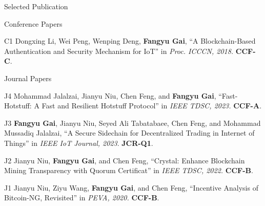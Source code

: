 \documentclass{resume} %
\begin{document}
\begin{rSection}{Selected Publication}
\begin{rSubsection}{Conference Papers}{}{}{}
\item [C1] Dongxing Li, Wei Peng, Wenping Deng, \textbf{Fangyu Gai}, ``A Blockchain-Based Authentication and Security Mechanism for IoT'' in \textit{Proc. ICCCN, 2018.}
\textbf{CCF-C}.

\end{rSubsection}

\begin{rSubsection}{Journal Papers}{}{}{}
\item [J4] Mohammad Jalalzai, Jianyu Niu, Chen Feng, and \textbf{Fangyu Gai}, ``Fast-Hotstuff: A Fast and Resilient Hotstuff Protocol'' in \textit{IEEE TDSC, 2023.}
\textbf{CCF-A}.

\item [J3] \textbf{Fangyu Gai}, Jianyu Niu, Seyed Ali Tabatabaee, Chen Feng, and Mohammad Mussadiq Jalalzai, ``A Secure Sidechain for Decentralized Trading in Internet of Things'' in \textit{IEEE IoT Journal, 2023}.
\textbf{JCR-Q1}.

\item [J2] Jianyu Niu, \textbf{Fangyu Gai}, and Chen Feng, ``Crystal: Enhance Blockchain Mining Transparency with Quorum Certificat'' in \textit{IEEE TDSC, 2022.}
\textbf{CCF-B}.

\item [J1] Jianyu Niu, Ziyu Wang, \textbf{Fangyu Gai}, and Chen Feng, ``Incentive Analysis of Bitcoin-NG, Revisited'' in \textit{PEVA, 2020.}
\textbf{CCF-B}.

\end{rSubsection}



\end{rSection}





\end{document}

